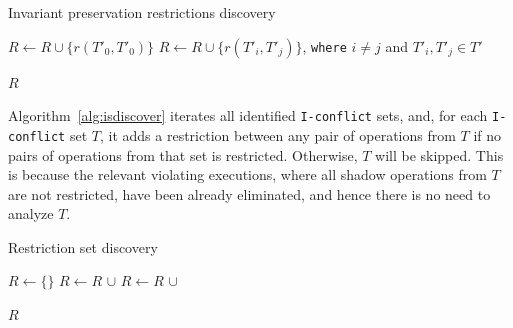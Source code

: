 \begin{algorithm}[t]
\caption{Invariant preservation restrictions discovery}
\label{alg:isdiscover}
\begin{algorithmic}[1]

\State {}

     \State $R \leftarrow R \cup \{r(T'_0, T'_0)\}$ 
   
     \State $R \leftarrow R \cup \{r(T'_i, T'_j)\}$, \texttt{where} $i \neq j$ and $T'_i, T'_j \in T'$
  \EndIf
\EndIf
\EndFor

\Return $R$
\EndFunction
\end{algorithmic}
\end{algorithm}

Algorithm~\ref{alg:isdiscover} iterates all identified {\tt I-conflict} sets, and,
for each {\tt I-conflict} set $T$, it adds a restriction between any pair of operations from $T$
if no pairs of operations from that set is restricted. Otherwise, $T$ will be skipped.
This is because the relevant violating executions, where all shadow operations from $T$
are not restricted, have been already eliminated, and hence
there is no need to analyze $T$.

\begin{algorithm}[t]
\caption{Restriction set discovery}
\label{alg:mrdiscover}
\begin{algorithmic}[1]
\State $R \leftarrow \{ \}$ 
\State $R \leftarrow R$ $\cup $  
\State $R \leftarrow R$ $\cup $  

\Return $R$
\EndFunction
\end{algorithmic}
\end{algorithm}

